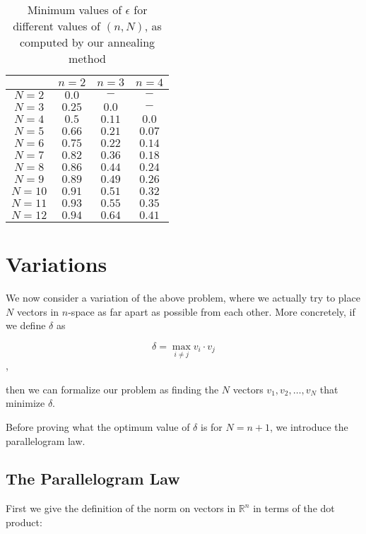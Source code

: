 \documentclass[11pt,letterpaper,twoside,english]{article}
\theoremstyle{theorem}
\theoremstyle{remark}
\providecommand{\R}{\mathbb{R}}
\begin{document}
\begin{table}
   \centering
    \begin{tabular}{ | c | c | c | c |}
    \hline
      & $n=2$ & $n=3$ & $n=4$ \\ \hline
    $N=2$ & $0.0$ & $-$ & $-$ \\ \hline
    $N=3$ & $0.25$ & $0.0$ & $-$ \\ \hline
    $N=4$ & $0.5$ & $0.11$ & $0.0$ \\ \hline
    $N=5$ & $0.66$ & $0.21$ & $0.07$ \\ \hline
    $N=6$ & $0.75$ & $0.22$ & $0.14$ \\ \hline
    $N=7$ & $0.82$ & $0.36$ & $0.18$ \\ \hline
    $N=8$ &  $0.86$ & $0.44$ & $0.24$ \\ \hline
    $N=9$ &  $0.89$ & $0.49$ & $0.26$ \\ \hline
    $N=10$ & $0.91$ & $0.51$ & $0.32$ \\ \hline
    $N=11$ & $0.93$  & $0.55$ & $0.35$ \\ \hline
    $N=12$ & $0.94$ & $0.64$ & $0.41$ \\
    \hline
    \end{tabular}
    \caption {Minimum values of $\epsilon$ for different values of $(n, N)$, as computed by our annealing method}
\end{table}



\section{Variations}

We now consider a variation of the above problem, where we actually try to place $N$ vectors in $n$-space as far apart as possible from each other. More concretely, if we define $\delta$ as

$$\delta = \max_{i \neq j} v_i \cdot v_j$$,

then we can formalize our problem as finding the $N$ vectors $v_1, v_2, \ldots, v_N$ that minimize $\delta$.

Before proving what the optimum value of $\delta$ is for $N= n+1$, we introduce the parallelogram law.

\subsection{The Parallelogram Law}

First we give the definition of the norm on vectors in $\R^n$ in terms of the dot product:
\end{document}
